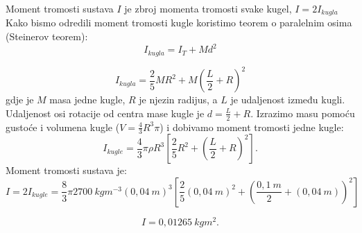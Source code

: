 

Moment tromosti sustava $I$ je zbroj momenta tromosti svake kugel, $I=2I_{kugla}$
Kako bismo odredili moment tromosti kugle koristimo teorem o paralelnim osima (Steinerov teorem):
$$
I_{kugla}= I_T+Md^2
$$

$$
I_{kugla}=\frac{2}{5}MR^2+M(\frac{L}{2}+R)^2
$$
gdje je $M$ masa jedne kugle, $R$ je njezin radijus, a $L$ je udaljenost između kugli. Udaljenost osi rotacije od centra mase kugle je $d=\frac{L}{2}+R$. Izrazimo masu pomoću gustoće i volumena kugle ($V=\frac{4}{3}R^3\pi$) i dobivamo moment tromosti jedne kugle:
$$
I_{kugle}=\frac{4}{3}\pi\rho R^3\left[\frac{2}{5}R^2 + \left(\frac{L}{2}+R \right)^2\right].
$$
Moment tromosti sustava je:
$$
I=2I_{kugle}=\frac{8}{3}\pi2700\ kgm^{-3} (0,04\ m)^3\left[\frac{2}{5}(0,04\ m)^2 + \left(\frac{0,1\ m}{2}+(0,04\ m) \right)^2\right]
$$

$$ I=0,01265\ kgm^2.$$

